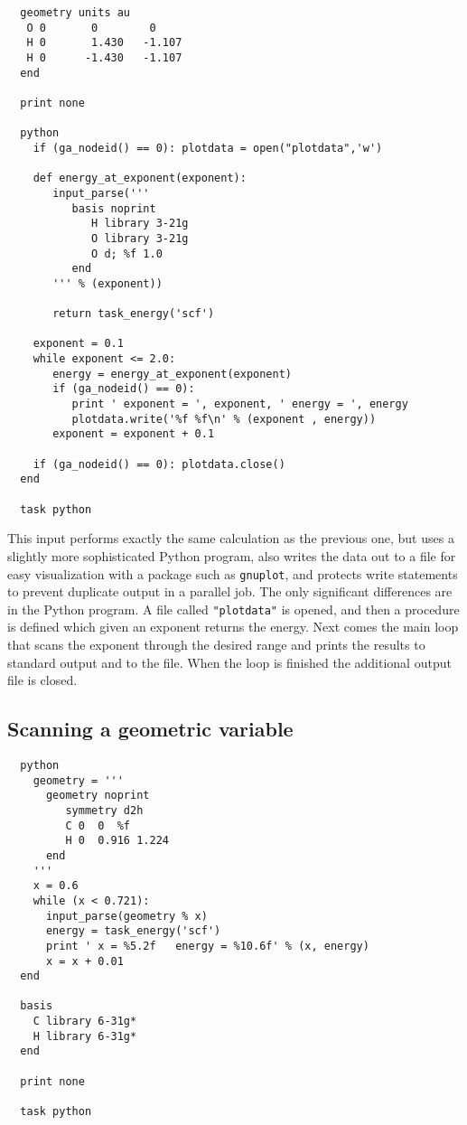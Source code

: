 \begin{verbatim}
  geometry units au
   O 0       0        0
   H 0       1.430   -1.107
   H 0      -1.430   -1.107
  end

  print none

  python
    if (ga_nodeid() == 0): plotdata = open("plotdata",'w')

    def energy_at_exponent(exponent):
       input_parse('''
          basis noprint
             H library 3-21g
             O library 3-21g
             O d; %f 1.0
          end
       ''' % (exponent))

       return task_energy('scf')

    exponent = 0.1
    while exponent <= 2.0:
       energy = energy_at_exponent(exponent)
       if (ga_nodeid() == 0):
          print ' exponent = ', exponent, ' energy = ', energy
          plotdata.write('%f %f\n' % (exponent , energy))
       exponent = exponent + 0.1

    if (ga_nodeid() == 0): plotdata.close()
  end

  task python
\end{verbatim}

This input performs exactly the same calculation as the previous one,
but uses a slightly more sophisticated Python program, also writes
the data out to a file for easy visualization with a package such as
\verb+gnuplot+, and protects write statements to prevent 
duplicate output in a parallel job.  The only significant differences
are in the Python program.  A file called \verb+"plotdata"+ is opened,
and then a procedure is defined which given an exponent returns the
energy.  Next comes the main loop that scans the exponent through the
desired range and prints the results to standard output and to the
file.  When the loop is finished the additional output file is closed.

\subsection{Scanning a geometric variable}

\begin{verbatim}
  python
    geometry = '''
      geometry noprint
         symmetry d2h
         C 0  0  %f
         H 0  0.916 1.224
      end
    '''
    x = 0.6
    while (x < 0.721):
      input_parse(geometry % x)
      energy = task_energy('scf')
      print ' x = %5.2f   energy = %10.6f' % (x, energy)
      x = x + 0.01
  end

  basis
    C library 6-31g*
    H library 6-31g*
  end

  print none

  task python
\end{verbatim}

